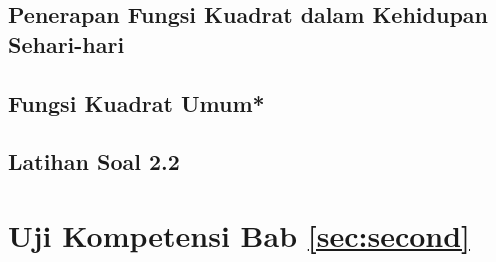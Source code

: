 	\kant[11-12]
	
\subsection{Penerapan Fungsi Kuadrat dalam Kehidupan Sehari-hari}
	
	\kant[13-14]
	
\subsection{Fungsi Kuadrat Umum*}
	
	\kant[15-16]
	
\subsection{Latihan Soal 2.2}
	
	\kant[17-18]

\newpage


\section{Uji Kompetensi Bab \ref{sec:second}}

\kant[6-10]